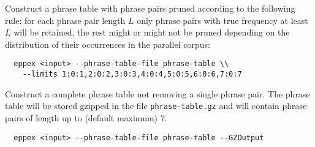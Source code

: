 Construct a phrase table with phrase pairs pruned according to the following rule:
for each phrase pair length $L$ only phrase pairs with true frequency at least
$L$ will be retained, the rest might or might not be pruned depending on the
distribution of their occurrences in the parallel corpus:
\begin{verbatim}
  eppex <input> --phrase-table-file phrase-table \\
    --limits 1:0:1,2:0:2,3:0:3,4:0:4,5:0:5,6:0:6,7:0:7
\end{verbatim}

Construct a complete phrase table not removing a single phrase pair.
The phrase table will be stored gzipped in the file \texttt{phrase-table.gz}
and will contain phrase pairs of length up to (default maximum) 7.
\begin{verbatim}
  eppex <input> --phrase-table-file phrase-table --GZOutput
\end{verbatim}
